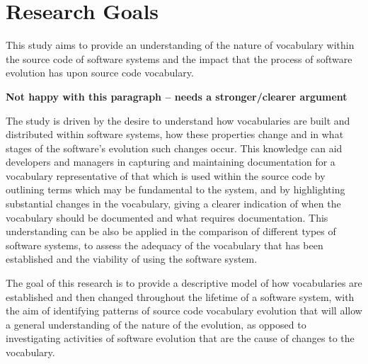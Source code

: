 % 

\section{Research Goals} %
\label{sec:research_goals}

This study aims to provide an understanding of the nature of vocabulary within the source code of software systems and the impact that the process of software evolution has upon source code vocabulary.

\textbf{Not happy with this paragraph -- needs a stronger/clearer argument}

The study is driven by the desire to understand how vocabularies are built and distributed within software systems, how these properties change and in what stages of the software's evolution such changes occur. This knowledge can aid developers and managers in capturing and maintaining documentation for a vocabulary representative of that which is used within the source code by outlining terms which may be fundamental to the system, and by highlighting substantial changes in the vocabulary, giving a clearer indication of when the vocabulary should be documented and what requires documentation. This understanding can be also be applied in the comparison of different types of software systems, to assess the adequacy of the vocabulary that has been established and the viability of using the software system.

The goal of this research is to provide a descriptive model of how vocabularies are established and then changed throughout the lifetime of a software system, with the aim of identifying patterns of source code vocabulary evolution that will allow a general understanding of the nature of the evolution, as opposed to investigating activities of software evolution that are the cause of changes to the vocabulary.


